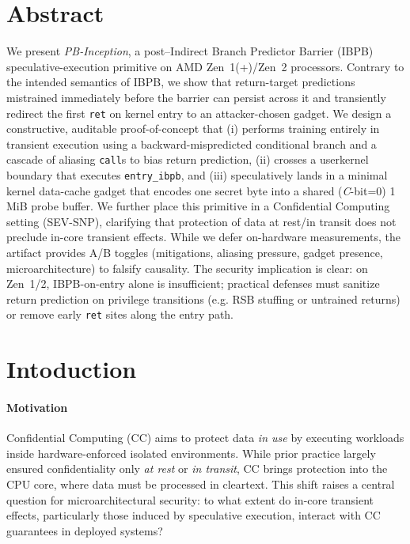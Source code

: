 \documentclass[11pt,a4paper]{article}
\begin{document}
\section*{Abstract}
We present \emph{PB-Inception}, a post–Indirect Branch Predictor Barrier (IBPB) speculative-execution primitive on AMD Zen~1(+)/Zen~2 processors. Contrary to the intended semantics of IBPB, we show that return-target predictions mistrained immediately before the barrier can persist across it and transiently redirect the first \texttt{ret} on kernel entry to an attacker-chosen gadget. We design a constructive, auditable proof-of-concept that (i) performs training entirely in transient execution using a backward-mispredicted conditional branch and a cascade of aliasing \texttt{call}s to bias return prediction, (ii) crosses a user{\textrightarrow}kernel boundary that executes \texttt{entry\_ibpb}, and (iii) speculatively lands in a minimal kernel data-cache gadget that encodes one secret byte into a shared (\emph{C}-bit{=}0) 1\,MiB probe buffer. We further place this primitive in a Confidential Computing setting (SEV-SNP), clarifying that protection of data at rest/in transit does not preclude in-core transient effects. While we defer on-hardware measurements, the artifact provides A/B toggles (mitigations, aliasing pressure, gadget presence, microarchitecture) to falsify causality. The security implication is clear: on Zen~1/2, IBPB-on-entry alone is insufficient; practical defenses must sanitize return prediction on privilege transitions (e.g. RSB stuffing or untrained returns) or remove early \texttt{ret} sites along the entry path.

\section{Intoduction}

\paragraph{Motivation}
Confidential Computing (CC) aims to protect data \emph{in use} by executing workloads inside hardware-enforced isolated environments. While prior practice largely ensured confidentiality only \emph{at rest} or \emph{in transit}, CC brings protection into the CPU core, where data must be processed in cleartext. This shift raises a central question for microarchitectural security: to what extent do in-core transient effects, particularly those induced by speculative execution, interact with CC guarantees in deployed systems?
\end{document}
